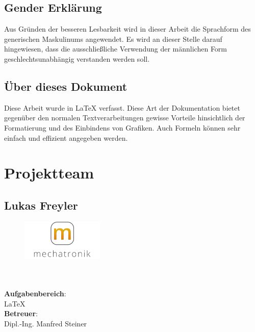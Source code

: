 \clearpage

\newpage
\thispagestyle{empty}
\mbox{}

\clearpage

\subsection*{Gender Erklärung}
\label{sec:gender-erklaerung}
Aus Gründen der besseren Lesbarkeit wird in dieser Arbeit die Sprachform des generischen Maskulinums angewendet. Es wird an dieser Stelle darauf hingewiesen, dass die ausschließliche Verwendung der männlichen Form geschlechtsunabhängig verstanden werden soll.

\subsection*{Über dieses Dokument}
\label{sec:ueber-dokument}
Diese Arbeit wurde in \LaTeX{} verfasst. Diese Art der Dokumentation bietet gegenüber den normalen Textverarbeitungen gewisse Vorteile hinsichtlich der Formatierung und des Einbindens von Grafiken. Auch Formeln können sehr einfach und effizient angegeben werden.

\clearpage

\newpage
\thispagestyle{empty}
\mbox{}

\clearpage

\section*{Projektteam}
\label{sec:projektteam}

\subsection*{Lukas Freyler}
\begin{figure}
\begin{center}
  \includegraphics[width=0.35\textwidth]{fig/logoMecha}
\end{center}
\end{figure}
\mbox{}\\
\mbox{}\\
\textbf{Aufgabenbereich}:\\
\LaTeX{}\\
\textbf{Betreuer}:\\
Dipl.-Ing. Manfred Steiner
\mbox{}\\
\mbox{}\\
\mbox{}\\
\mbox{}\\
\mbox{}\\
\mbox{}\\


